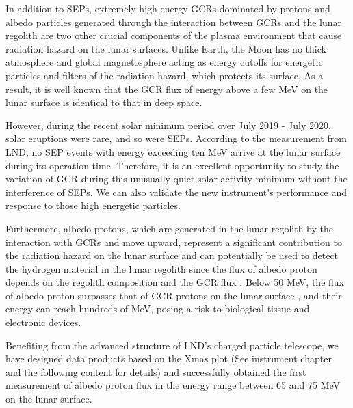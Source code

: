 
In addition to \acp{SEP}, extremely high-energy \acp{GCR} dominated by protons and albedo particles generated through the interaction between \acp{GCR} and the lunar regolith are two other crucial components of the plasma environment that cause radiation hazard on the lunar surfaces.
Unlike Earth, the Moon has no thick atmosphere and global magnetosphere acting as energy cutoffs for energetic particles and filters of the radiation hazard, which protects its surface. As a result, it is well known that the \ac{GCR} flux of energy above a few MeV on the lunar surface is identical to that in deep space.

However, during the recent solar minimum period over July 2019 - July 2020, solar eruptions were rare, and so were \acp{SEP}. According to the measurement from \ac{LND}, no \ac{SEP} events with energy exceeding ten MeV arrive at the lunar surface during its operation time.
Therefore, it is an excellent opportunity to study the variation of \acs{GCR}  during this unusually quiet solar activity minimum \citep{Fu2021ApJS} without the interference of \acp{SEP}. We can also validate the new instrument's performance and response to those high energetic particles.    

Furthermore, albedo protons, which are generated in the lunar regolith by the interaction with \acp{GCR} and move upward, represent a significant contribution to the radiation hazard on the lunar surface and can potentially be used to detect the hydrogen material in the lunar regolith since the flux of albedo proton depends on the regolith composition and the \ac{GCR} flux \citep{Schwadron2016Icarus}.
Below 50 MeV, the flux of albedo proton surpasses that of \ac{GCR} protons on the lunar surface \citep{Dobynde2021JGRE, Wimmer2020SSRv}, and their energy can reach hundreds of MeV, posing a risk to biological tissue and electronic devices.

Benefiting from the advanced structure of \ac{LND}'s charged particle telescope, we have designed data products based on the Xmas plot (See instrument chapter and the following content for details) and successfully obtained the first measurement of albedo proton flux in the energy range between 65 and 75 MeV on the lunar surface.


